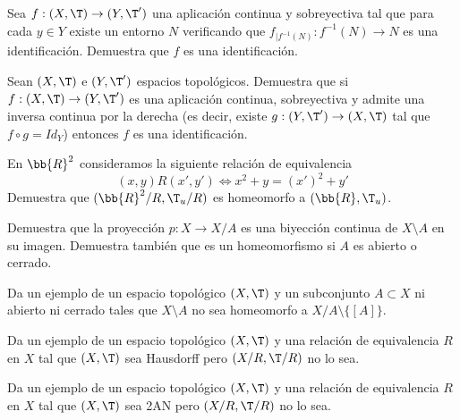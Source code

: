 \begin{ejercicio}
    Sea $f : (X,\T) \to (Y, \T')$ una aplicación continua y sobreyectiva tal que para cada $y \in Y$ existe un entorno $N$ verificando que $f_{\big|f^{-1}(N)} : f^{-1}(N) \to N$ es una identificación. Demuestra que $f$ es una identificación.
\end{ejercicio}

\begin{ejercicio}
    Sean $(X,\T)$ e $(Y, \T')$ espacios topológicos. Demuestra que si $f : (X,\T) \to (Y, \T')$ es una aplicación continua, sobreyectiva y admite una inversa continua por la derecha (es decir, existe $g : (Y, \T') \to (X,\T)$ tal que $f \circ g = Id_Y$) entonces $f$ es una identificación.
\end{ejercicio}

\begin{ejercicio}
    En $\bb{R}^2$ consideramos la siguiente relación de equivalencia
    \begin{equation*}
        (x, y)R(x', y') \Longleftrightarrow x^2 + y = (x')^2 + y'
    \end{equation*}
    Demuestra que $(\bb{R}^2/R, \T_u/R)$ es homeomorfo a $(\bb{R}, \T_u)$.
\end{ejercicio}

\begin{ejercicio}
    Demuestra que la proyección $p : X \to X/A$ es una biyección continua de $X \setminus A$ en su imagen. Demuestra también que es un homeomorfismo si $A$ es abierto o cerrado.
\end{ejercicio}

\begin{ejercicio}
    Da un ejemplo de un espacio topológico $(X,\T)$ y un subconjunto $A \subset X$ ni abierto ni cerrado tales que $X \setminus A$ no sea homeomorfo a $X/A \setminus \{[A]\}$.
\end{ejercicio}

\begin{ejercicio}
    Da un ejemplo de un espacio topológico $(X,\T)$ y una relación de equivalencia $R$ en $X$ tal que $(X,\T)$ sea Hausdorff pero $(X/R, \T/R)$ no lo sea.
\end{ejercicio}

\begin{ejercicio}
    Da un ejemplo de un espacio topológico $(X,\T)$ y una relación de equivalencia $R$ en $X$ tal que $(X,\T)$ sea 2AN pero $(X/R, \T /R)$ no lo sea.
\end{ejercicio}

